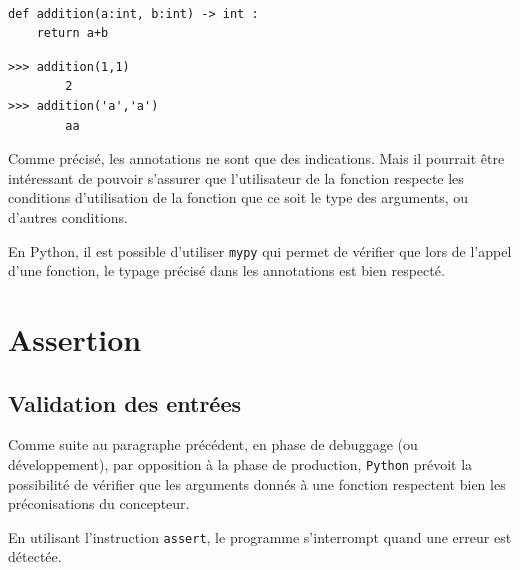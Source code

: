 \begin{exemple}~\\
\begin{minipage}[c]{.45\linewidth}
\begin{lstlisting}
def addition(a:int, b:int) -> int : 
    return a+b
\end{lstlisting}
\end{minipage} \hfill
\begin{minipage}[c]{.45\linewidth}
\begin{lstlisting}
>>> addition(1,1)
        2
>>> addition('a','a')
        aa
\end{lstlisting}
\end{minipage} 

\end{exemple}

Comme précisé, les annotations ne sont que des indications. Mais il pourrait être intéressant de pouvoir s'assurer que l'utilisateur de la fonction respecte les conditions d'utilisation de la fonction que ce soit le type des arguments, ou d'autres conditions.

\begin{rem}
En Python, il est possible d'utiliser \texttt{mypy} qui permet de vérifier que lors de l'appel d'une fonction, le typage précisé dans les annotations est bien respecté. 
\end{rem}



\section{Assertion}
\subsection{Validation des entrées}
Comme suite au paragraphe précédent, en phase de debuggage (ou développement), par opposition à la phase de production, \texttt{Python} prévoit la possibilité de vérifier que les arguments donnés à une fonction respectent bien les préconisations du concepteur. 

En utilisant l’instruction \texttt{assert}, le programme s'interrompt quand une erreur est détectée. 

